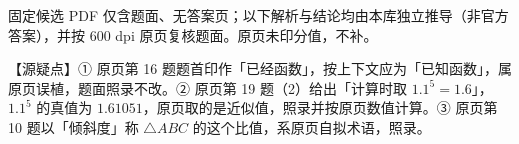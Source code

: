 \begin{gktip}
固定候选 PDF 仅含题面、无答案页；以下解析与结论均由本库独立推导（非官方答案），并按 600 dpi 原页复核题面。原页未印分值，不补。

【源疑点】① 原页第 16 题题首印作「已经函数」，按上下文应为「已知函数」，属原页误植，题面照录不改。② 原页第 19 题（2）给出「计算时取 $1.1^5=1.6$」，$1.1^5$ 的真值为 $1.61051$，原页取的是近似值，照录并按原页数值计算。③ 原页第 10 题以「倾斜度」称 $\triangle ABC$ 的这个比值，系原页自拟术语，照录。
\end{gktip}

